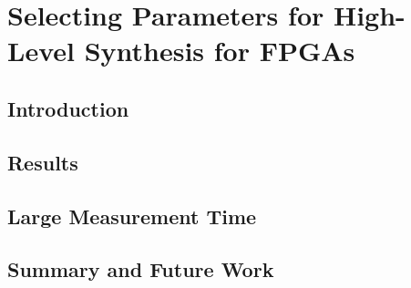 \section{Selecting Parameters for High-Level Synthesis for FPGAs}
\label{sec:paramSelFPGA}

\subsection{Introduction}
\label{subsec:FPGAintro}

\subsection{Results}
\label{subsec:FPGAres}

\subsection{Large Measurement Time}
\label{subsec:bigtime}

\subsection{Summary and Future Work}
\label{subsec:FPGAconcl}
